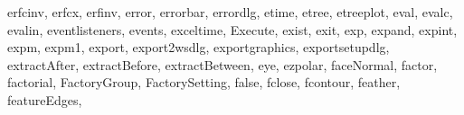 {{        erfcinv,%
        erfcx,%
        erfinv,%
        error,%
        errorbar,%
        errordlg,%
        etime,%
        etree,%
        etreeplot,%
        eval,%
        evalc,%
        evalin,%
        eventlisteners,%
        events,%
        exceltime,%
        Execute,%
        exist,%
        exit,%
        exp,%
        expand,%
        expint,%
        expm,%
        expm1,%
        export,%
        export2wsdlg,%
        exportgraphics,%
        exportsetupdlg,%
        extractAfter,%
        extractBefore,%
        extractBetween,%
        eye,%
        ezpolar,%
        faceNormal,%
        factor,%
        factorial,%
        FactoryGroup,%
        FactorySetting,%
        false,%
        fclose,%
        fcontour,%
        feather,%
        featureEdges,%
}}
